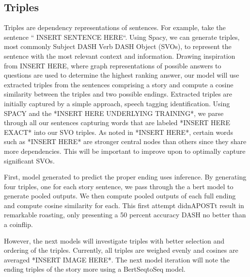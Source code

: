 \documentclass{article}
\begin{document}
\begin{multicols}{2}
\section{Triples}
Triples are dependency representations of sentences. For example, take the sentence “ INSERT SENTENCE HERE“. Using Spacy, we can generate triples, 
most commonly Subject DASH Verb DASH Object (SVOs), to represent the sentence with the most relevant context and information. Drawing inspiration from 
INSERT HERE, where graph representations of possible answers to questions are used to determine the highest ranking answer, our model will use 
extracted triples from the sentences comprising a story and compute a cosine similarity between the triples and two possible endings. Extracted 
triples are initially captured by a simple approach, speech tagging identification. Using SPACY and the *INSERT HERE UNDERLYING TRAINING*, we 
parse through all our sentences capturing words that are labeled *INSERT HERE EXACT* into our SVO triples. As noted in *INSERT HERE*, certain 
words such as *INSERT HERE* are stronger central nodes than others since they share more dependencies.  This will be important to improve upon 
to optimally capture significant SVOs.

First, model generated to predict the proper ending uses inference. By generating four triples, one for each story sentence, we pass through the 
a bert model to generate pooled outputs. We then compute pooled outputs of each full ending and compute cosine similarity for each. This first 
attempt didnAPOSTt result in remarkable roasting, only presenting a 50 percent accuracy DASH no better than a coinflip.

However, the next models will investigate triples with better selection and ordering of the triples. Currently, all triples are weighed evenly 
and cosines are averaged *INSERT IMAGE HERE*. The next model iteration will note the ending triples of the story more using a BertSeqtoSeq model. 
\end{multicols}
\end{document}
